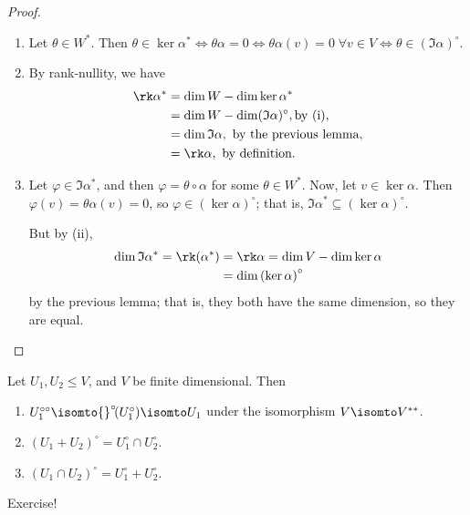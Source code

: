 \begin{proof}
\mbox{}
\begin{enumerate}
	\shortskip
	\item Let $\theta\in W^*$. Then $\theta\in\ker\alpha^* \iff \theta\alpha=0 \iff \theta\alpha(v)=0 \;\forall v\in V \iff \theta\in\left( \Im\alpha \right)^\circ$. %
	\item By rank-nullity, we have
	\begin{align*}
		\rk\alpha^*
		&= \dim W-\dim\ker\alpha^* \\
		&= \dim W-\dim(\Im \alpha)^\circ, \text{by (i)}, \\
		&= \dim \Im\alpha, \text{ by the previous lemma,} \\
		&= \rk\alpha, \text{ by definition.}
	\end{align*}
	\item Let $\varphi\in\Im\alpha^*$, and then $\varphi=\theta\circ\alpha$ for some $\theta\in W^*$. Now, let $v\in\ker\alpha$. Then $\varphi(v)=\theta\alpha(v)=0$, so $\varphi\in\left( \ker\alpha \right)^\circ$; that is, $\Im\alpha^* \subseteq\left( \ker\alpha \right)^\circ$. %
	
	But by (ii),
	\begin{align*}
		\dim\Im\alpha^* = \rk(\alpha^*)
		&= \rk\alpha = \dim V - \dim\ker\alpha \\
		&= \dim\left( \ker\alpha \right)^\circ
	\end{align*}
	by the previous lemma; that is, they both have the same dimension, so they are equal. \qedhere %
\end{enumerate}
\end{proof}

\begin{lemma}
	Let $U_1,U_2\leq V$, and $V$ be finite dimensional. Then %
	\begin{enumerate}
		\shortskip
		\item $U_1^{\circ\circ} \isomto {}^\circ\!(U_1^\circ) \isomto U_1$ under the isomorphism $V\isomto V^{**}$. %
		\item $(U_1+U_2)^\circ = U_1^\circ \cap U_2^\circ$.
		\item $(U_1\cap U_2)^\circ = U_1^\circ + U_2^\circ$.
	\end{enumerate}
\end{lemma}

\begin{proof*}
	Exercise!
\end{proof*}
